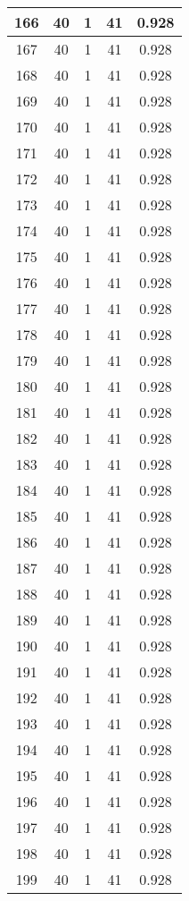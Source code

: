 \documentclass[letterpaper, 12pt]{article}
\begin{document}
\begin{longtable}{|c|c|c|c|c|}
\hline
166 & 40 & 1 & 41 & 0.928 \\
\hline
167 & 40 & 1 & 41 & 0.928 \\
\hline
168 & 40 & 1 & 41 & 0.928 \\
\hline
169 & 40 & 1 & 41 & 0.928 \\
\hline
170 & 40 & 1 & 41 & 0.928 \\
\hline
171 & 40 & 1 & 41 & 0.928 \\
\hline
172 & 40 & 1 & 41 & 0.928 \\
\hline
173 & 40 & 1 & 41 & 0.928 \\
\hline
174 & 40 & 1 & 41 & 0.928 \\
\hline
175 & 40 & 1 & 41 & 0.928 \\
\hline
176 & 40 & 1 & 41 & 0.928 \\
\hline
177 & 40 & 1 & 41 & 0.928 \\
\hline
178 & 40 & 1 & 41 & 0.928 \\
\hline
179 & 40 & 1 & 41 & 0.928 \\
\hline
180 & 40 & 1 & 41 & 0.928 \\
\hline
181 & 40 & 1 & 41 & 0.928 \\
\hline
182 & 40 & 1 & 41 & 0.928 \\
\hline
183 & 40 & 1 & 41 & 0.928 \\
\hline
184 & 40 & 1 & 41 & 0.928 \\
\hline
185 & 40 & 1 & 41 & 0.928 \\
\hline
186 & 40 & 1 & 41 & 0.928 \\
\hline
187 & 40 & 1 & 41 & 0.928 \\
\hline
188 & 40 & 1 & 41 & 0.928 \\
\hline
189 & 40 & 1 & 41 & 0.928 \\
\hline
190 & 40 & 1 & 41 & 0.928 \\
\hline
191 & 40 & 1 & 41 & 0.928 \\
\hline
192 & 40 & 1 & 41 & 0.928 \\
\hline
193 & 40 & 1 & 41 & 0.928 \\
\hline
194 & 40 & 1 & 41 & 0.928 \\
\hline
195 & 40 & 1 & 41 & 0.928 \\
\hline
196 & 40 & 1 & 41 & 0.928 \\
\hline
197 & 40 & 1 & 41 & 0.928 \\
\hline
198 & 40 & 1 & 41 & 0.928 \\
\hline
199 & 40 & 1 & 41 & 0.928 \\
\hline
\end{longtable}
\end{document}
